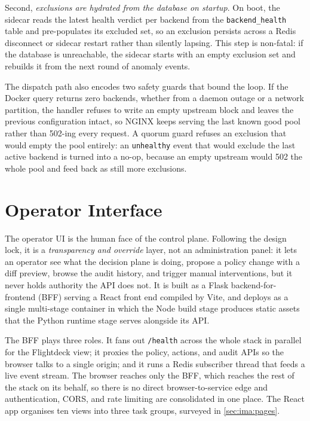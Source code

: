 Second, \emph{exclusions are hydrated from the database on startup}. On boot, the
sidecar reads the latest health verdict per backend from the \texttt{backend\_health}
table and pre-populates its excluded set, so an exclusion persists across a Redis
disconnect or sidecar restart rather than silently lapsing. This step is non-fatal:
if the database is unreachable, the sidecar starts with an empty exclusion set and
rebuilds it from the next round of anomaly events.

The dispatch path also encodes two safety guards that bound the loop. If the
Docker query returns zero backends, whether from a daemon outage or a network
partition, the handler refuses to write an empty upstream block and leaves the
previous configuration intact, so NGINX keeps serving the last known good pool
rather than 502-ing every request. A quorum guard refuses an exclusion that would
empty the pool entirely: an \texttt{unhealthy} event that would exclude the last
active backend is turned into a no-op, because an empty upstream would 502 the
whole pool and feed back as still more exclusions.

\section{Operator Interface}
\label{sec:ima:ui}

The operator UI is the human face of the control plane. Following the design lock,
it is a \emph{transparency and override} layer, not an administration panel: it lets
an operator see what the decision plane is doing, propose a policy change with a diff
preview, browse the audit history, and trigger manual interventions, but it never
holds authority the API does not. It is built as a Flask backend-for-frontend (BFF)
serving a React front end compiled by Vite, and deploys as a single multi-stage
container in which the Node build stage produces static assets that the Python
runtime stage serves alongside its API.

The BFF plays three roles. It fans out \texttt{/health} across the whole stack in
parallel for the Flightdeck view; it proxies the policy, actions, and audit APIs
so the browser talks to a single origin; and it runs a Redis subscriber thread
that feeds a live event stream. The browser reaches only the BFF, which reaches
the rest of the stack on its behalf, so there is no direct browser-to-service
edge and authentication, CORS, and rate limiting are consolidated in one place.
The React app organises ten views into three task groups, surveyed in
\cref{sec:ima:pages}.

